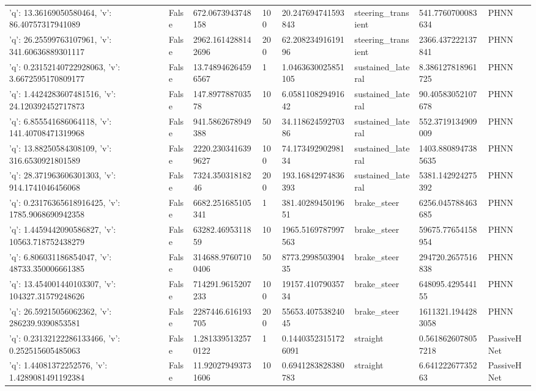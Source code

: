 \begin{tabular}{llllllll}
{'q': 13.36169050580464, 'v': 86.40757317941089} & False & 672.0673943748158 & 100 & 20.247694741593843 & steering\_transient & 541.7760700083634 & PHNN \\
{'q': 26.25599763107961, 'v': 341.60636889301117} & False & 2962.1614288142696 & 200 & 62.20823491619196 & steering\_transient & 2366.437222137841 & PHNN \\
{'q': 0.23152140722928063, 'v': 3.6672595170809177} & False & 13.748946264596567 & 1 & 1.0463630025851105 & sustained\_lateral & 8.386127818961725 & PHNN \\
{'q': 1.4424283607481516, 'v': 24.120392452717873} & False & 147.897788703578 & 10 & 6.058110829491642 & sustained\_lateral & 90.40583052107678 & PHNN \\
{'q': 6.855541686064118, 'v': 141.40708471319968} & False & 941.5862678949388 & 50 & 34.11862459270386 & sustained\_lateral & 552.3719134909009 & PHNN \\
{'q': 13.88250584308109, 'v': 316.6530921801589} & False & 2220.2303416399627 & 100 & 74.17349290298134 & sustained\_lateral & 1403.8808947385635 & PHNN \\
{'q': 28.371963606301303, 'v': 914.1741046456068} & False & 7324.35031818246 & 200 & 193.16842974836393 & sustained\_lateral & 5381.142924275392 & PHNN \\
{'q': 0.23176365618916425, 'v': 1785.9068690942358} & False & 6682.251685105341 & 1 & 381.4028945019651 & brake\_steer & 6256.045788463685 & PHNN \\
{'q': 1.4459442090586827, 'v': 10563.718752438279} & False & 63282.4695311859 & 10 & 1965.5169787997563 & brake\_steer & 59675.77654158954 & PHNN \\
{'q': 6.806031186854047, 'v': 48733.350006661385} & False & 314688.97607100406 & 50 & 8773.299850390435 & brake\_steer & 294720.2657516838 & PHNN \\
{'q': 13.454001440103307, 'v': 104327.31579248626} & False & 714291.9615207233 & 100 & 19157.41079035734 & brake\_steer & 648095.429544155 & PHNN \\
{'q': 26.59215056062362, 'v': 286239.9390853581} & False & 2287446.616193705 & 200 & 55653.40753824045 & brake\_steer & 1611321.1944283058 & PHNN \\
{'q': 0.23132122286133466, 'v': 0.252515605485063} & False & 1.2813395132570122 & 1 & 0.14403523151726091 & straight & 0.5618626078057218 & PassiveHNet \\
{'q': 1.44081372252576, 'v': 1.4289081491192384} & False & 11.920279493731606 & 10 & 0.6941283828380783 & straight & 6.64122267735263 & PassiveHNet \\

\end{tabular}
